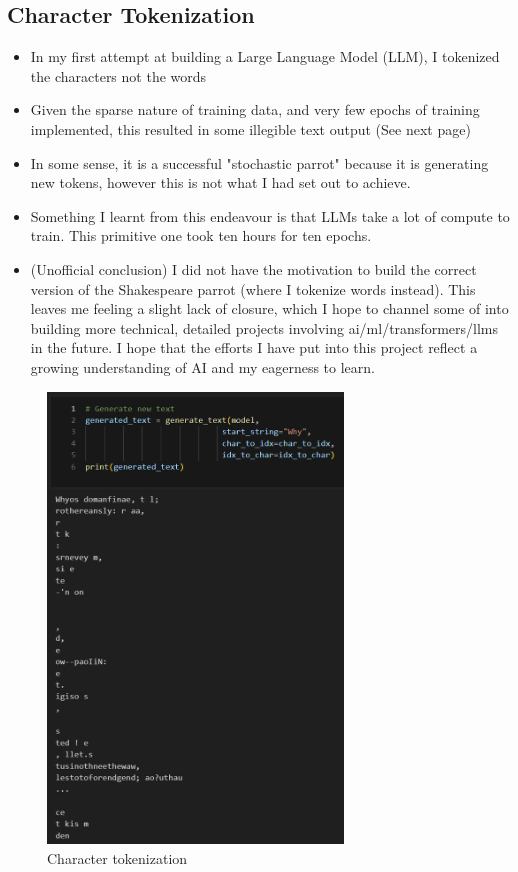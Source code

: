 \documentclass[12pt,a4paper]{article}
\begin{document}
\subsection{Character Tokenization}
\begin{itemize}
\item In my first attempt at building a Large Language Model (LLM), I tokenized the characters not the words
\item Given the sparse nature of training data, and very few epochs of training implemented, this resulted in some illegible text output (See next page)
\item In some sense, it is a successful "stochastic parrot" because it is generating new tokens, however this is not what I had set out to achieve. 
\item Something I learnt from this endeavour is that LLMs take a lot of compute to train. This primitive one took ten hours for ten epochs. 
\item (Unofficial conclusion) I did not have the motivation to build the correct version of the Shakespeare parrot (where I tokenize words instead). This leaves me feeling a slight lack of closure, which I hope to channel some of into building more technical, detailed projects involving ai/ml/transformers/llms in the future. I hope that the efforts I have put into this project reflect a growing understanding of AI and my eagerness to learn.
\end{itemize}
\pagebreak
\begin{figure}[h]
    \centering
    \includegraphics[width=0.7\textwidth]{gen_1} 
    \caption{Character tokenization}
    \label{fig:example}
\end{figure}
\pagebreak
\end{document}

